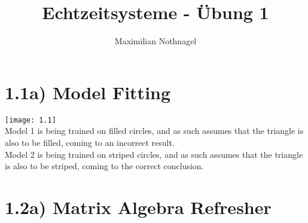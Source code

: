 \documentclass{article}
\title{Echtzeitsysteme - Übung 1}
\author{Maximilian Nothnagel}
\date{}
\begin{document}
	
	\maketitle
	
	\section*{1.1a) Model Fitting}
	\texttt{[image: 1.1]}\\
	Model 1 is being trained on filled circles, and as such assumes that the triangle is also to be filled, coming to an incorrect result.\\
	Model 2 is being trained on striped circles, and as such assumes that the triangle is also to be striped, coming to the correct conclusion.
	
	\section{1.2a) Matrix Algebra Refresher}
\end{document}
